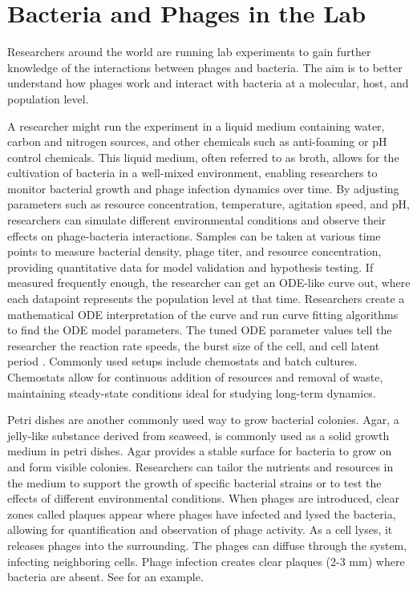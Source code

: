 \section{Bacteria and Phages in the Lab}
Researchers around the world are running lab experiments to gain further knowledge of the interactions between phages and bacteria. 
The aim is to better understand how phages work and interact with bacteria at a molecular, host, and population level. 

A researcher might run the experiment in a liquid medium containing water, carbon and nitrogen sources, and other chemicals such as anti-foaming or pH control chemicals. 
This liquid medium, often referred to as broth, allows for the cultivation of bacteria in a well-mixed environment, enabling researchers to monitor bacterial growth and phage infection dynamics over time. 
By adjusting parameters such as resource concentration, temperature, agitation speed, and pH, researchers can simulate different environmental conditions and observe their effects on phage-bacteria interactions. 
Samples can be taken at various time points to measure bacterial density, phage titer, and resource concentration, providing quantitative data for model validation and hypothesis testing. 
If measured frequently enough, the researcher can get an ODE-like curve out, where each datapoint represents the population level at that time. 
Researchers create a mathematical ODE interpretation of the curve and run curve fitting algorithms to find the ODE model parameters. 
The tuned ODE parameter values tell the researcher the reaction rate speeds, the burst size of the cell, and cell latent period \cite{gengUsingBacterialPopulation2024, mullaExtremeDiversityPhage2024}. 
Commonly used setups include chemostats and batch cultures. 
Chemostats allow for continuous addition of resources and removal of waste, maintaining steady-state conditions ideal for studying long-term dynamics.

Petri dishes are another commonly used way to grow bacterial colonies. 
Agar, a jelly-like substance derived from seaweed, is commonly used as a solid growth medium in petri dishes. 
Agar provides a stable surface for bacteria to grow on and form visible colonies. 
Researchers can tailor the nutrients and resources in the medium to support the growth of specific bacterial strains or to test the effects of different environmental conditions. 
When phages are introduced, clear zones called plaques appear where phages have infected and lysed the bacteria, allowing for quantification and observation of phage activity. 
As a cell lyses, it releases phages into the surrounding. 
The phages can diffuse through the system, infecting neighboring cells. 
Phage infection creates clear plaques (2-3 mm) where bacteria are absent. 
See  for an example.

